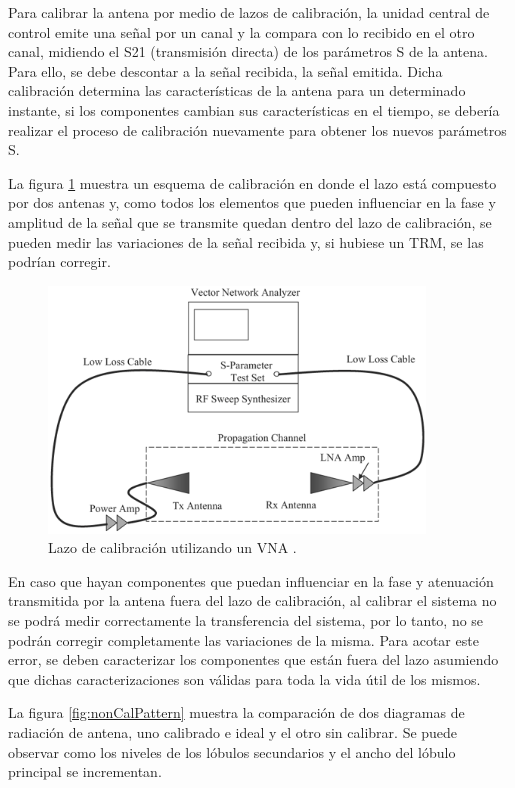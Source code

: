 Para calibrar la antena por medio de lazos de calibración, la unidad central de control emite una señal por un canal y la 
compara con lo recibido en el otro canal, midiendo el S21 (transmisión directa) de los parámetros S de la antena. Para ello, se
debe descontar a la señal recibida, la señal emitida. Dicha calibración determina las características de la antena para un
determinado instante, si los componentes cambian sus características en el tiempo, se debería realizar el proceso de
calibración nuevamente para obtener los nuevos parámetros S.

La figura \ref{fig:calibrationLoop} muestra un esquema de calibración en donde el lazo está compuesto por dos antenas y, como
todos los elementos que pueden influenciar en la fase y amplitud de la señal que se transmite quedan dentro del lazo de 
calibración, se pueden medir las variaciones de la señal recibida y, si hubiese un TRM, se las podrían corregir.

\begin{figure}[H]
 \centering
 \includegraphics[width=10cm]{gfx/calibrationLoop.png}
 \caption{Lazo de calibración utilizando un VNA \cite{Reed2012}.}
 \label{fig:calibrationLoop}
\end{figure}

En caso que hayan componentes que puedan influenciar en la fase y atenuación transmitida por la antena fuera del lazo de
calibración, al calibrar el sistema no se podrá medir correctamente la transferencia del sistema, por lo tanto, no se podrán
corregir completamente las variaciones de la misma. Para acotar este error, se deben caracterizar los componentes que están
fuera del lazo asumiendo que dichas caracterizaciones son válidas para toda la vida útil de los mismos.

La figura \ref{fig:nonCalPattern} muestra la comparación de dos diagramas de radiación de antena, uno calibrado e ideal y el
otro sin calibrar. Se puede observar como los niveles de los lóbulos secundarios y el ancho del lóbulo principal se incrementan.

